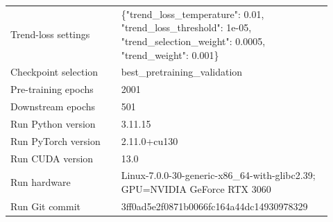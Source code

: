\begin{table}[p]
\begin{tabular}{p{0.32\linewidth}p{0.60\linewidth}}
Trend-loss settings & \{"trend\_loss\_temperature": 0.01, "trend\_loss\_threshold": 1e-05, "trend\_selection\_weight": 0.0005, "trend\_weight": 0.001\} \\
Checkpoint selection & best\_pretraining\_validation \\
Pre-training epochs & 2001 \\
Downstream epochs & 501 \\
Run Python version & 3.11.15 \\
Run PyTorch version & 2.11.0+cu130 \\
Run CUDA version & 13.0 \\
Run hardware & Linux-7.0.0-30-generic-x86\_64-with-glibc2.39; GPU=NVIDIA GeForce RTX 3060 \\
Run Git commit & 3ff0ad5e2f0871b0066fc164a44dc14930978329 \\
\bottomrule
\end{tabular}
\end{table}
